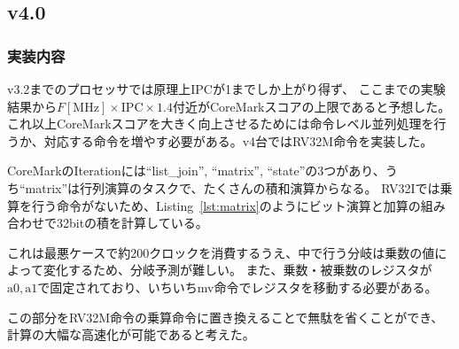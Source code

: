 \documentclass[dvipdfmx,10pt,a4paper,titlepage]{jsarticle}
\begin{document}
    \subsection{v4.0}
    \subsubsection{実装内容}
    v3.2までのプロセッサでは原理上IPCが1までしか上がり得ず、
    ここまでの実験結果から$F[\mathrm{MHz}] \times \mathrm{IPC}\times 1.4$付近がCoreMarkスコアの上限であると予想した。
    これ以上CoreMarkスコアを大きく向上させるためには命令レベル並列処理を行うか、対応する命令を増やす必要がある。v4台ではRV32M命令を実装した。

    CoreMarkのIterationには``list\_join'', ``matrix'', ``state''の3つがあり、うち``matrix''は行列演算のタスクで、たくさんの積和演算からなる。
    RV32Iでは乗算を行う命令がないため、Listing~\ref{lst:matrix}のようにビット演算と加算の組み合わせで32bitの積を計算している。
    
    これは最悪ケースで約200クロックを消費するうえ、中で行う分岐は乗数の値によって変化するため、分岐予測が難しい。
    また、乗数・被乗数のレジスタが$\mathrm{a0}, \mathrm{a1}$で固定されており、いちいちmv命令でレジスタを移動する必要がある。

    この部分をRV32M命令の乗算命令に置き換えることで無駄を省くことができ、計算の大幅な高速化が可能であると考えた。
\end{document}
